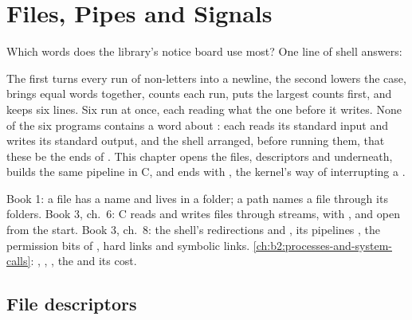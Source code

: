 \chapter{Files, Pipes and Signals}\label{ch:b2:files-pipes-signals}

Which words does the library's notice board use most? One line of shell answers:

\label{out:b2:files-pipes-signals:hook}

The first  turns every run of non-letters into a newline, the second lowers the case,  brings
equal words together,  counts each run,  puts the largest counts first, and 
keeps six lines. Six  run at once, each reading what the one before it writes. None of the six programs
contains a word about : each reads its standard input and writes its standard output, and the shell arranged,
before running them, that these be the ends of . This chapter opens the files, descriptors and  underneath,
builds the same pipeline in C, and ends with , the kernel's way of interrupting a .

\begin{recall}
Book 1: a file has a name and lives in a folder; a path names a file through its folders. Book 3, ch.~6: C reads and
writes files through  streams, with ,  and  open from the start.
Book 3, ch.~8: the shell's redirections \code{<} and \code{>}, its pipelines \code{|}, the permission bits of
, hard links and symbolic links. \cref{ch:b2:processes-and-system-calls}: , ,
, the  and its cost.
\end{recall}

\section{File descriptors}\label{sec:b2:files-pipes-signals:descriptors}

